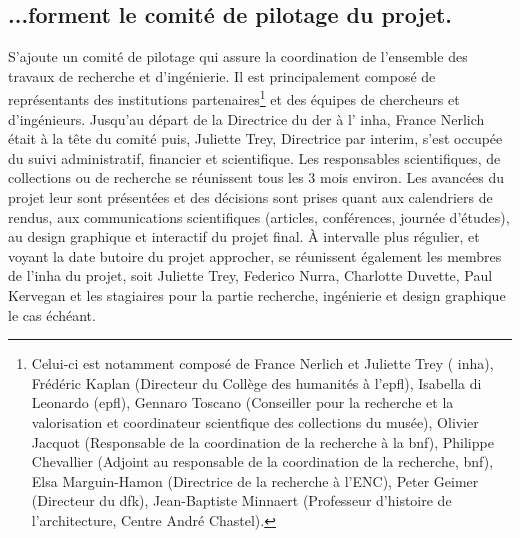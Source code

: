 \subsection{...forment le comité de pilotage du projet.}
S'ajoute un comité de pilotage qui assure la coordination de l'ensemble des travaux de recherche et d'ingénierie. Il est principalement composé de représentants des institutions partenaires\footnote{Celui-ci est notamment composé de France Nerlich et Juliette Trey ( \acrshort{inha}), Frédéric Kaplan (Directeur du Collège des humanités à l'\acrshort{epfl}), Isabella di Leonardo (\acrshort{epfl}), Gennaro Toscano (Conseiller pour la recherche et la valorisation et coordinateur scientfique des collections du musée), Olivier Jacquot (Responsable de la coordination de la recherche à la \acrshort{bnf}), Philippe Chevallier (Adjoint au responsable de la coordination de la recherche, \acrshort{bnf}), Elsa Marguin-Hamon (Directrice de la recherche à l'ENC), Peter Geimer (Directeur du \acrshort{dfk}), Jean-Baptiste Minnaert (Professeur d'histoire de l'architecture, Centre André Chastel).} et des équipes de chercheurs et d'ingénieurs. Jusqu'au départ de la Directrice du \acrshort{der} à l' \acrshort{inha}, France Nerlich était à la tête du comité puis, Juliette Trey, Directrice par interim, s'est occupée du suivi administratif, financier et scientifique. Les responsables scientifiques, de collections ou de recherche se réunissent tous les 3 mois environ. Les avancées du projet leur sont présentées et des décisions sont prises quant aux calendriers de rendus, aux communications scientifiques (articles, conférences, journée d'études), au design graphique et interactif du projet final. À intervalle plus régulier, et voyant la date butoire du projet approcher, se réunissent également les membres de l'\acrshort{inha} du projet, soit Juliette Trey, Federico Nurra, Charlotte Duvette, Paul Kervegan et les stagiaires pour la partie recherche, ingénierie et design graphique le cas échéant. 

